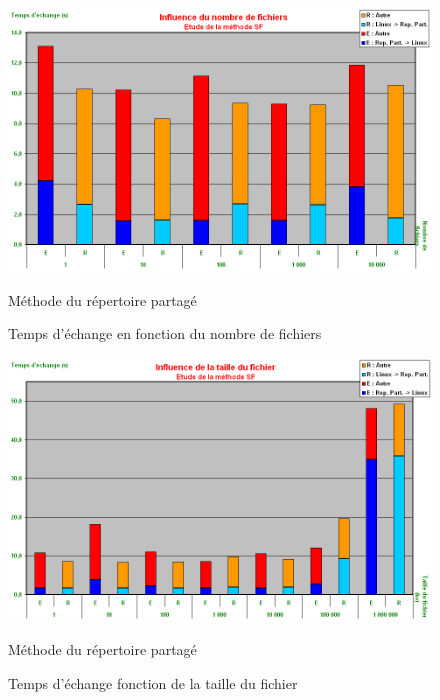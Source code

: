 \begin{figure}[!h]
	\center
	\includegraphics[scale=0.4]{img/tests/nombre_SF.png}
	\caption{Temps d'échange en fonction du nombre de fichiers}
	Méthode du répertoire partagé
\end{figure}

\begin{figure}[!h]
	\center
	\includegraphics[scale=0.4]{img/tests/taille_SF.png}
	\caption{Temps d'échange fonction de la taille du fichier}
	Méthode du répertoire partagé
\end{figure}